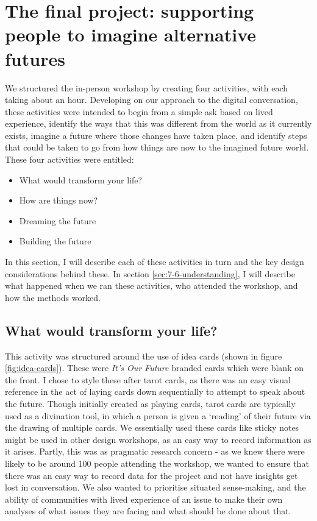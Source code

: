 \section{The final project: supporting people to imagine alternative futures }
\label{sec:7-5-final}
We structured the in-person workshop by creating four activities, with each taking about an hour. Developing on our approach to the digital conversation, these activities were intended to begin from a simple ask based on lived experience, identify the ways that this was different from the world as it currently exists, imagine a future where those changes have taken place, and identify steps that could be taken to go from how things are now to the imagined future world. These four activities were entitled:
\begin{itemize}
    \item What would transform your life?
    \item How are things now?
    \item Dreaming the future
    \item Building the future
\end{itemize}
In this section, I will describe each of these activities in turn and the key design considerations behind these. In section \ref{sec:7-6-understanding}, I will describe what happened when we ran these activities, who attended the workshop, and how the methods worked.

\subsection{What would transform your life?}
This activity was structured around the use of idea cards (shown in figure \ref{fig:idea-cards}). These were \textit{It's Our Future} branded cards which were blank on the front. I chose to style these after tarot cards, as there was an easy visual reference in the act of laying cards down sequentially to attempt to speak about the future.  Though initially created as playing cards, tarot cards are typically used as a divination tool, in which a person is given a `reading' of their future via the drawing of multiple cards. We essentially used these cards like sticky notes might be used in other design workshops, as an easy way to record information as it arises. Partly, this was as pragmatic research concern - as we knew there were likely to be around 100 people attending the workshop, we wanted to ensure that there was an easy way to record data for the project and not have insights get lost in conversation. We also wanted to prioritise situated sense-making, and the ability of communities with lived experience of an issue to make their own analyses of what issues they are facing and what should be done about that. 

